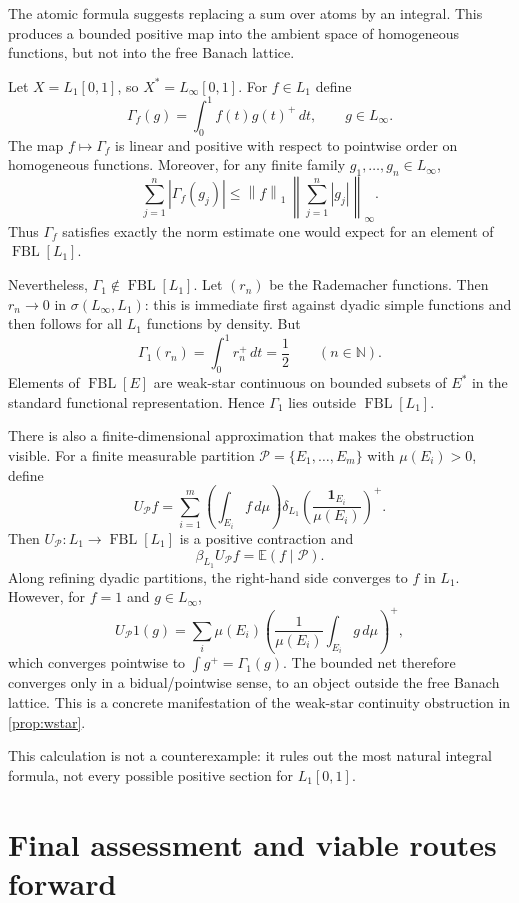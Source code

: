 \documentclass[11pt]{article}
\newcommand{\FBL}{\operatorname{FBL}}
\newcommand{\N}{\mathbb{N}}
\newcommand{\norm}[1]{\left\lVert #1\right\rVert}
\begin{document}
The atomic formula suggests replacing a sum over atoms by an integral.  This
produces a bounded positive map into the ambient space of homogeneous
functions, but not into the free Banach lattice.

Let $X=L_1[0,1]$, so $X^*=L_\infty[0,1]$.  For $f\in L_1$ define
\[
 \Gamma_f(g)=\int_0^1 f(t)g(t)^+\,dt,
 \qquad g\in L_\infty.
\]
The map $f\mapsto\Gamma_f$ is linear and positive with respect to pointwise
order on homogeneous functions.  Moreover, for any finite family
$g_1,\dots,g_n\in L_\infty$,
\[
 \sum_{j=1}^n|\Gamma_f(g_j)|
 \leq \norm{f}_1\,
 \norm{\sum_{j=1}^n|g_j|}_\infty.
\]
Thus $\Gamma_f$ satisfies exactly the norm estimate one would expect for an
element of $\FBL[L_1]$.

Nevertheless, $\Gamma_1\notin\FBL[L_1]$.  Let $(r_n)$ be the Rademacher
functions.  Then $r_n\to0$ in $\sigma(L_\infty,L_1)$: this is immediate first
against dyadic simple functions and then follows for all $L_1$ functions by
density.  But
\[
 \Gamma_1(r_n)=\int_0^1r_n^+\,dt=\frac12
 \qquad(n\in\N).
\]
Elements of $\FBL[E]$ are weak-star continuous on bounded subsets of $E^*$ in
the standard functional representation.  Hence $\Gamma_1$ lies outside
$\FBL[L_1]$.

There is also a finite-dimensional approximation that makes the obstruction
visible.  For a finite measurable partition
$\mathcal P=\{E_1,\dots,E_m\}$ with $\mu(E_i)>0$, define
\[
 U_{\mathcal P}f
 =\sum_{i=1}^m
 \left(\int_{E_i}f\,d\mu\right)
 \delta_{L_1}\left(\frac{\mathbf1_{E_i}}{\mu(E_i)}\right)^+.
\]
Then $U_{\mathcal P}:L_1\to\FBL[L_1]$ is a positive contraction and
\[
 \beta_{L_1}U_{\mathcal P}f
 =\mathbb E(f\mid\mathcal P).
\]
Along refining dyadic partitions, the right-hand side converges to $f$ in
$L_1$.  However, for $f=1$ and $g\in L_\infty$,
\[
 U_{\mathcal P}1(g)
 =\sum_i\mu(E_i)
 \left(\frac1{\mu(E_i)}\int_{E_i}g\,d\mu\right)^+,
\]
which converges pointwise to $\int g^+=\Gamma_1(g)$.  The bounded net therefore
converges only in a bidual/pointwise sense, to an object outside the free
Banach lattice.  This is a concrete manifestation of the weak-star
continuity obstruction in \cref{prop:wstar}.

This calculation is not a counterexample: it rules out the most natural
integral formula, not every possible positive section for $L_1[0,1]$.

\section{Final assessment and viable routes forward}
\end{document}
